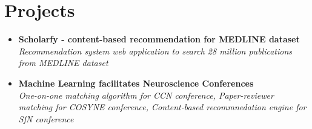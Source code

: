 \section{\sc Projects}
\begin{itemize}[leftmargin=0cm, label={}]

\item {\bf Scholarfy - content-based recommendation for MEDLINE dataset}\\
{\em Recommendation system web application to search 28 million publications from MEDLINE dataset}

\item {\bf Machine Learning facilitates Neuroscience Conferences}\\
{\em One-on-one matching algorithm for CCN conference, Paper-reviewer matching for COSYNE conference, Content-based recommnedation engine for SfN conference}



\end{itemize}
